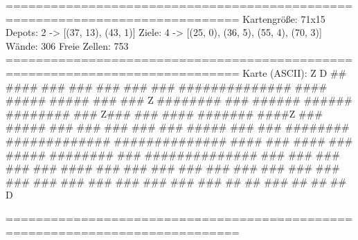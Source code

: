=============================================================================
Kartengröße:           71x15
Depots:                2 -> [(37, 13), (43, 1)]
Ziele:                 4 -> [(25, 0), (36, 5), (55, 4), (70, 3)]
Wände:                 306
Freie Zellen:          753
=============================================================================
Karte (ASCII):
                         Z
                                           D
   ##       ####     ###       ###     ###         ###  ###
  ##############     ####     #####    #####       ###  ###           Z
  ########   ###    ######   ######    ########    ### Z###
  ###              #### ####### ####Z  ###  #####  ###  ###      ###
  ###              ###   #####   ###   ###    ########  #############
  ##############  ####    ###    ####  ###       #####  ########  ###
  ##############          ###          ###         ###  ###       ###
  ####       ###          ###          ###              ###       ###
  ###        ###          ###          ###              ###       ###
  ###        ###          ###          ###              ###       ###
   ##         ##          ###           ##              ##         ##
                                     D

=============================================================================